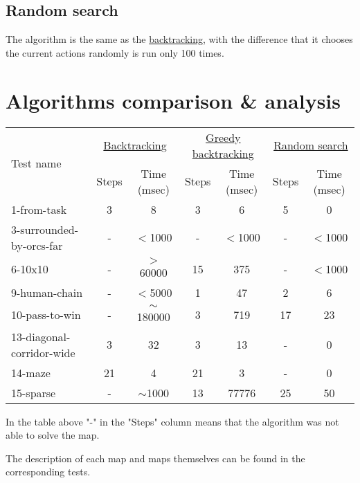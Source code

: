 \documentclass[a4paper, oneside, titlepage]{article}
\begin{document}
\subsection{Random search} \label{sec:alg:random}
The algorithm is the same as the \hyperref[sec:alg:backtracking]{backtracking}, with the difference that it chooses the current actions randomly is run only 100 times.


\section{Algorithms comparison \& analysis}

\begin{center}
\label{table:algorithms_comparison}
    \begin{tabular}{|l||c|c|c|c|c|c|}
        \hline
         \multirow{2}{*}{Test name} & \multicolumn{2}{|c|}{\hyperref[sec:alg:backtracking]{Backtracking}} & \multicolumn{2}{|c|}{\hyperref[sec:alg:greedy_backtracking]{Greedy backtracking}} & \multicolumn{2}{|c|}{\hyperref[sec:alg:random]{Random search}} \\
         \cline{2-7}
         & Steps & Time (msec) & Steps & Time (msec) & Steps & Time (msec) \\
        \hline
        1-from-task & 3 & 8 & 3 & 6 & 5 & 0 \\
        \hline
        3-surrounded-by-orcs-far & - & $<$1000 & - & $<$1000 & - & $<$1000 \\
        \hline
        6-10x10 & - & $>$60000 & 15 & 375 & - & $<$1000 \\
        \hline
        9-human-chain & - & $<$5000 & 1 & 47 & 2 & 6 \\
        \hline
        10-pass-to-win & - & $\sim$180000 & 3 & 719 & 17 & 23 \\
        \hline
        13-diagonal-corridor-wide & 3 & 32 & 3 & 13 & - & 0 \\
        \hline
        14-maze & 21 & 4 & 21 & 3 & - & 0 \\
        \hline
        15-sparse & - & $\sim$1000 & 13 & 77776 & 25 & 50 \\
        \hline
    \end{tabular}
\end{center}

In the table above "-" in the "Steps" column means that the algorithm was not able to solve the map.

The description of each map and maps themselves can be found in the corresponding tests.
\end{document}
